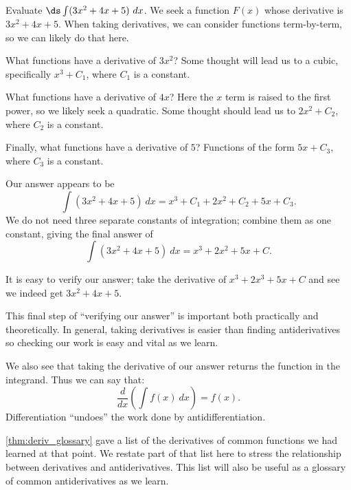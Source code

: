 \begin{example}\label{ex_anti3}
Evaluate $\ds \int (3x^2 + 4x+5)\ dx$.
\solution
We seek a function $F(x)$ whose derivative is $3x^2+4x+5$. When taking derivatives, we can consider functions term-by-term, so we can likely do that here.

What functions have a derivative of $3x^2$? Some thought will lead us to a cubic, specifically $x^3+C_1$, where $C_1$ is a constant. 

What functions have a derivative of $4x$? Here the $x$ term is raised to the first power, so we likely seek a quadratic. Some thought should lead us to $2x^2+C_2$, where $C_2$ is a constant.

Finally, what functions have a derivative of $5$? Functions of the form $5x+C_3$, where $C_3$ is a constant.

Our answer appears to be 
\[\int (3x^2+4x+5)\ dx = x^3+C_1+2x^2+C_2+5x+C_3.\]
We do not need three separate constants of integration; combine them as one constant, giving the final answer of 
\[\int (3x^2+4x+5)\ dx = x^3+2x^2+5x+C.\]

It is easy to verify our answer; take the derivative of $x^3+2x^3+5x+C$ and see we indeed get $3x^2+4x+5$.
\end{example}

This final step of ``verifying our answer'' is important both practically and theoretically. In general, taking derivatives is easier than finding antiderivatives so checking our work is easy and vital as we learn.

We also see that taking the derivative of our answer returns the function in the integrand. Thus we can say that:
\[\frac{d}{dx}\left(\int f(x)\ dx\right) = f(x).\]
Differentiation ``undoes'' the work done by antidifferentiation. 

\autoref{thm:deriv_glossary} gave a list of the derivatives of common functions we had learned at that point. We restate part of that list here to stress the relationship between derivatives and antiderivatives. This list will also be useful as a glossary of common antiderivatives as we learn.

